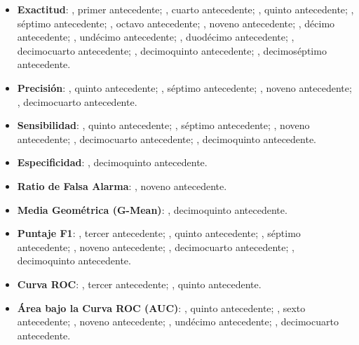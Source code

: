 \begin{itemize}
	\item \textbf{Exactitud}: \citeauthor{pr_chen2013kickpredict}, primer antecedente; \citeauthor{pr_chen2015predcrowd}, cuarto antecedente; \citeauthor{pr_beckwith2016predcrowd}, quinto antecedente; \citeauthor{pr_yuan2016textanalytics}, séptimo antecedente; \citeauthor{pr_sawhney2016usingLT}, octavo antecedente; \citeauthor{pr_kaur2017socmedcrowd}, noveno antecedente; \citeauthor{pr_kamath2018suplearn}, décimo antecedente; \citeauthor{pr_yu2018deeplearning}, undécimo antecedente; \citeauthor{pr_lee2018contentDL}, duodécimo antecedente; \citeauthor{pr_cheng2019deeplearning}, decimocuarto antecedente; \citeauthor{pr_chen2019keywords_crowdfunding}, decimoquinto antecedente; \citeauthor{pr_shafqat2019topicpredictions}, decimoséptimo antecedente.
	\item \textbf{Precisión}: \citeauthor{pr_beckwith2016predcrowd}, quinto antecedente; \citeauthor{pr_yuan2016textanalytics}, séptimo antecedente; \citeauthor{pr_kaur2017socmedcrowd}, noveno antecedente; \citeauthor{pr_cheng2019deeplearning}, decimocuarto antecedente.
	\item \textbf{Sensibilidad}: \citeauthor{pr_beckwith2016predcrowd}, quinto antecedente; \citeauthor{pr_yuan2016textanalytics}, séptimo antecedente; \citeauthor{pr_kaur2017socmedcrowd}, noveno antecedente; \citeauthor{pr_cheng2019deeplearning}, decimocuarto antecedente; \citeauthor{pr_chen2019keywords_crowdfunding}, decimoquinto antecedente.
	\item \textbf{Especificidad}: \citeauthor{pr_chen2019keywords_crowdfunding}, decimoquinto antecedente.
	\item \textbf{Ratio de Falsa Alarma}: \citeauthor{pr_kaur2017socmedcrowd}, noveno antecedente.
	\item \textbf{Media Geométrica (G-Mean)}: \citeauthor{pr_chen2019keywords_crowdfunding}, decimoquinto antecedente.
	\item \textbf{Puntaje F1}: \citeauthor{pr_zhou2015projectdesc}, tercer antecedente; \citeauthor{pr_beckwith2016predcrowd}, quinto antecedente; \citeauthor{pr_yuan2016textanalytics}, séptimo antecedente; \citeauthor{pr_kaur2017socmedcrowd}, noveno antecedente; \citeauthor{pr_cheng2019deeplearning}, decimocuarto antecedente; \citeauthor{pr_chen2019keywords_crowdfunding}, decimoquinto antecedente.
	\item \textbf{Curva ROC}: \citeauthor{pr_zhou2015projectdesc}, tercer antecedente; \citeauthor{pr_beckwith2016predcrowd}, quinto antecedente.
	\item \textbf{Área bajo la Curva ROC (AUC)}: \citeauthor{pr_beckwith2016predcrowd}, quinto antecedente; \citeauthor{pr_li2016predcrowd}, sexto antecedente; \citeauthor{pr_kaur2017socmedcrowd}, noveno antecedente; \citeauthor{pr_yu2018deeplearning}, undécimo antecedente; \citeauthor{pr_cheng2019deeplearning}, decimocuarto antecedente.

\end{itemize}
